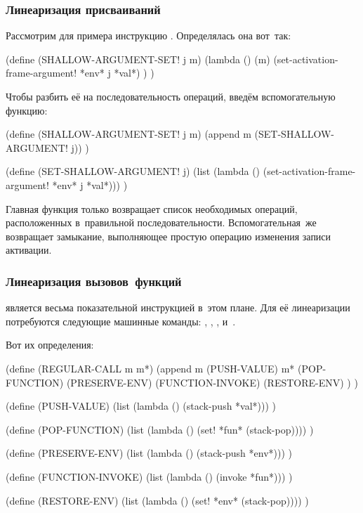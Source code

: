 \subsubsection{Линеаризация присваиваний}%
\label{compilation/bytes/customize/sssect:lin-assignment}

Рассмотрим для примера инструкцию . Определялась она
вот~так:

\begin{code:lisp}
(define (SHALLOW-ARGUMENT-SET! j m)
  (lambda ()
    (m)
    (set-activation-frame-argument! *env* j *val*) ) )
\end{code:lisp}

Чтобы разбить её на последовательность операций, введём вспомогательную функцию:

\begin{code:lisp}
(define (SHALLOW-ARGUMENT-SET! j m)
  (append m (SET-SHALLOW-ARGUMENT! j)) )

(define (SET-SHALLOW-ARGUMENT! j)
  (list (lambda () (set-activation-frame-argument! *env* j *val*))) )
\end{code:lisp}

Главная функция только возвращает список необходимых операций, расположенных
в~правильной последовательности. Вспомогательная~же возвращает замыкание,
выполняющее простую операцию изменения записи активации.


\subsubsection{Линеаризация вызовов~функций}%
\label{compilation/bytes/customize/sssect:lin-invocation}

 является весьма показательной инструкцией в~этом плане. Для её
линеаризации потребуются следующие машинные команды: ,
, ,  и~.

Вот их определения:

\begin{code:lisp}
(define (REGULAR-CALL m m*)
  (append m (PUSH-VALUE)
          m* (POP-FUNCTION) (PRESERVE-ENV)
             (FUNCTION-INVOKE) (RESTORE-ENV) ) )

(define (PUSH-VALUE)
  (list (lambda () (stack-push *val*))) )

(define (POP-FUNCTION)
  (list (lambda () (set! *fun* (stack-pop)))) )

(define (PRESERVE-ENV)
  (list (lambda () (stack-push *env*))) )

(define (FUNCTION-INVOKE)
  (list (lambda () (invoke *fun*))) )

(define (RESTORE-ENV)
  (list (lambda () (set! *env* (stack-pop)))) )
\end{code:lisp}

